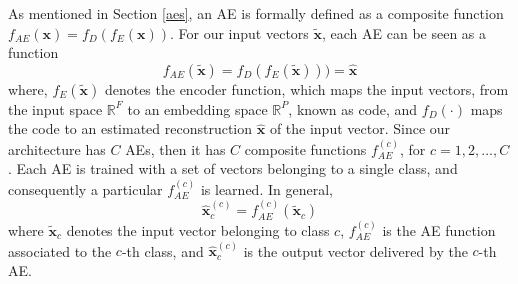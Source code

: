 \documentclass[journal,article,submit,pdftex,moreauthors]{Definitions/mdpi}
\begin{document}
As mentioned in Section \ref{aes}, an AE is formally defined as a composite function $f_{AE}(\mathbf{x}) = f_D(f_E(\mathbf{x}))$. For our input vectors $\mathbf{\tilde{x}}$, each AE can be seen as a function
\begin{equation}
	f_{AE}(\mathbf{\tilde{x}}) = f_D(f_E(\mathbf{\tilde{x}}))) = \mathbf{\hat{x}}
\end{equation}
where, $f_E(\mathbf{\tilde{x}})$ denotes the encoder function, which maps the input vectors, from the input space $\mathbb{R}^F$ to an embedding space $\mathbb{R}^P$, known as code, and $f_D(\cdot)$ maps the code to an estimated reconstruction $\mathbf{\hat{x}}$ of the input vector.
Since our architecture has $C$ \ac{AE}s, then it has $C$ composite functions $f_{AE}^{(c)}$, for $c=1,2,\dots,C$. Each \ac{AE} is trained with a set of vectors belonging to a single class, and consequently a particular $f_{AE}^{(c)}$ is learned. In general,
\begin{equation}
    \mathbf{\hat{x}}_c^{(c)} = f_{AE}^{(c)}(\mathbf{\tilde{x}}_c)
\end{equation}
where $\mathbf{\tilde{x}}_c$ denotes the input vector belonging to class $c$, $f_{AE}^{(c)}$ is the \ac{AE} function associated to the $c$-th class, and $\mathbf{\hat{x}}_c^{(c)}$ is the output vector delivered by the $c$-th \ac{AE}. 

\end{document}
